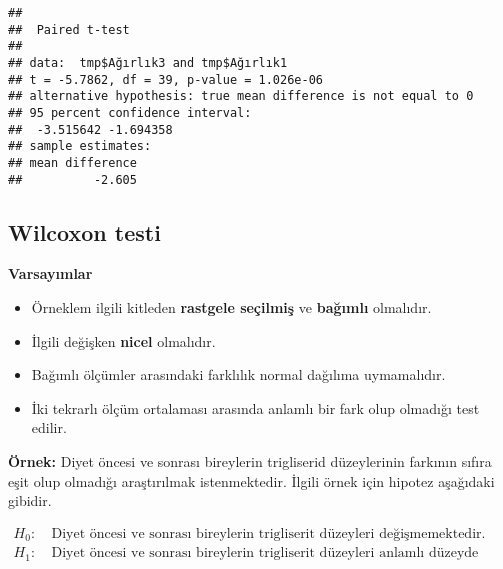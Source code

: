 \documentclass[
]{article}
\newenvironment{Shaded}{\begin{snugshade}}{\end{snugshade}}
\newcommand{\AttributeTok}[1]{\textcolor[rgb]{0.77,0.63,0.00}{#1}}
\newcommand{\CommentTok}[1]{\textcolor[rgb]{0.56,0.35,0.01}{\textit{#1}}}
\newcommand{\ConstantTok}[1]{\textcolor[rgb]{0.00,0.00,0.00}{#1}}
\newcommand{\FunctionTok}[1]{\textcolor[rgb]{0.00,0.00,0.00}{#1}}
\newcommand{\NormalTok}[1]{#1}
\newcommand{\SpecialCharTok}[1]{\textcolor[rgb]{0.00,0.00,0.00}{#1}}
\newcommand{\StringTok}[1]{\textcolor[rgb]{0.31,0.60,0.02}{#1}}
\providecommand{\tightlist}{%
  \setlength{\itemsep}{0pt}\setlength{\parskip}{0pt}}
\begin{document}
\begin{Shaded}
\end{Shaded}

\begin{verbatim}
## 
##  Paired t-test
## 
## data:  tmp$Ağırlık3 and tmp$Ağırlık1
## t = -5.7862, df = 39, p-value = 1.026e-06
## alternative hypothesis: true mean difference is not equal to 0
## 95 percent confidence interval:
##  -3.515642 -1.694358
## sample estimates:
## mean difference 
##          -2.605
\end{verbatim}

\hypertarget{wilcoxon-testi}{%
\subsection{Wilcoxon testi}\label{wilcoxon-testi}}

\textbf{Varsayımlar}

\begin{itemize}
\tightlist
\item
  Örneklem ilgili kitleden \textbf{rastgele seçilmiş} ve
  \textbf{bağımlı} olmalıdır.
\item
  İlgili değişken \textbf{nicel} olmalıdır.
\item
  Bağımlı ölçümler arasındaki farklılık normal dağılıma uymamalıdır.
\item
  İki tekrarlı ölçüm ortalaması arasında anlamlı bir fark olup olmadığı
  test edilir.
\end{itemize}

\textbf{Örnek:} Diyet öncesi ve sonrası bireylerin trigliserid
düzeylerinin farkının sıfıra eşit olup olmadığı araştırılmak
istenmektedir. İlgili örnek için hipotez aşağıdaki gibidir.

\begin{align*}
  H_0:&~ \text{Diyet öncesi ve sonrası bireylerin trigliserit düzeyleri değişmemektedir.} \\
  H_1:&~ \text{Diyet öncesi ve sonrası bireylerin trigliserit düzeyleri anlamlı düzeyde değişmektedir.}
\end{align*}
\end{document}
